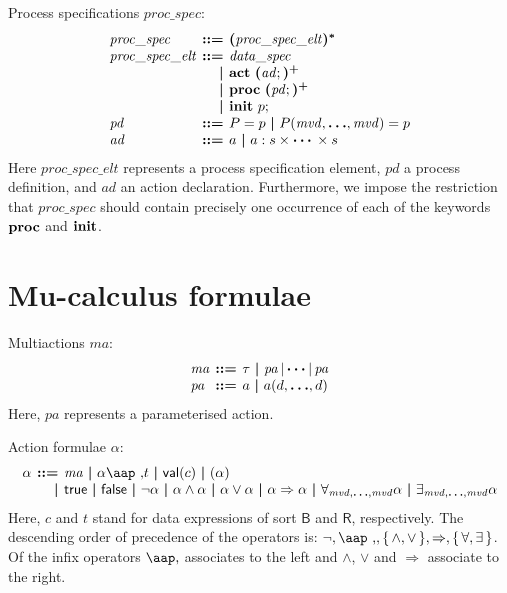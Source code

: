 \documentclass[a4paper,fleqn,10pt]{article}
\makeatletter
\newcommand{\f}[1]{\ensuremath{\mathit{#1}}}
\newcommand{\sbool}{\ensuremath{\mathsf{B}}}
\newcommand{\sreal}{\ensuremath{\mathsf{R}}}
\newenvironment{tightarray}[1]
  {\setlength{\arraycolsep}{2pt}%
   \begin{array}{@{}#1@{}}%
  }
  {\end{array}%
  }
\newcommand{\set}[1]{\ensuremath{\{\,#1\,\}}}
\newcommand{\at}[1]{\mbox{\aap ,} #1}
\newcommand{\limp}{\ensuremath{\Rightarrow}}
\newcommand{\mb}[1]{\text{\boldmath$#1$}}
\newcommand{\kwact}{{\bf act}}
\newcommand{\kwproc}{{\bf proc}}
\newcommand{\kwinit}{{\bf init}}
\makeatother
\begin{document}
Process specifications $\f{proc\_spec}$:
\[\begin{tightarray}{lrl}
\f{proc\_spec}      & \mb{::=} & \mb{(}\f{proc\_spec\_elt}\mb{)^{*}}\\
\f{proc\_spec\_elt} & \mb{::=} & \f{data\_spec}\\
                    & \mb{|}   & \kwact\ \mb{(}\f{ad};\mb{)^{+}}\\
                    & \mb{|}   & \kwproc\ \mb{(}\f{pd};\mb{)^{+}}\\
                    & \mb{|}   & \kwinit\ p;\\
\f{pd}              & \mb{::=} & P = p\ \mb{|}\ P(\f{mvd},\mb{\ldots},\f{mvd}) = p\\
\f{ad}              & \mb{::=} & a\ \mb{|}\ a: s \times \mb{\cdots} \times s
\end{tightarray}\]
Here $\f{proc\_spec\_elt}$ represents a process specification element, $\f{pd}$ a process definition, and $\f{ad}$ an action declaration. Furthermore, we impose the restriction that $\f{proc\_spec}$ should contain precisely one occurrence of each of the keywords $\kwproc$ and $\kwinit$.

\section{Mu-calculus formulae}

Multiactions $\f{ma}$:
\[\begin{tightarray}{lrl}
\f{ma} & \mb{::=} & \tau\ \mb{|}\ \f{pa}\,|\,\mb{\cdots} |\,\f{pa}\\
\f{pa} & \mb{::=} & a\ \mb{|}\ a(d,\mb{\ldots},d)
\end{tightarray}\]
Here, $\f{pa}$ represents a parameterised action.

Action formulae $\alpha$:
\[\begin{tightarray}{lrl}
\alpha & \mb{::=} & \f{ma}\ \mb{|}\ 
                    \alpha\at t\ \mb{|}\ 
                    \mathsf{val}(c)\ \mb{|}\ 
                    ( \alpha )\\ 
       & \mb{|}   & \mathsf{true}\ \mb{|}\ 
                    \mathsf{false}\ \mb{|}\ 
                    \neg \alpha\ \mb{|}\ 
                    \alpha \land \alpha\ \mb{|}\ 
                    \alpha \lor  \alpha\ \mb{|}\ 
                    \alpha \limp \alpha\ \mb{|}\ 
                    \forall_{\f{mvd},\mb{\ldots},\f{mvd}} \alpha\ \mb{|}\ 
                    \exists_{\f{mvd},\mb{\ldots},\f{mvd}} \alpha\\
\end{tightarray}\]
Here, $c$ and $t$ stand for data expressions of sort $\sbool$ and $\sreal$,
respectively.  The descending order of precedence of the operators is: $\neg,
\at, \set{\land,\lor}, \limp, \set{\forall, \exists}$.  Of the infix operators
$\at$ associates to the left and $\land$, $\lor$ and $\limp$ associate to the
right.
\end{document}
